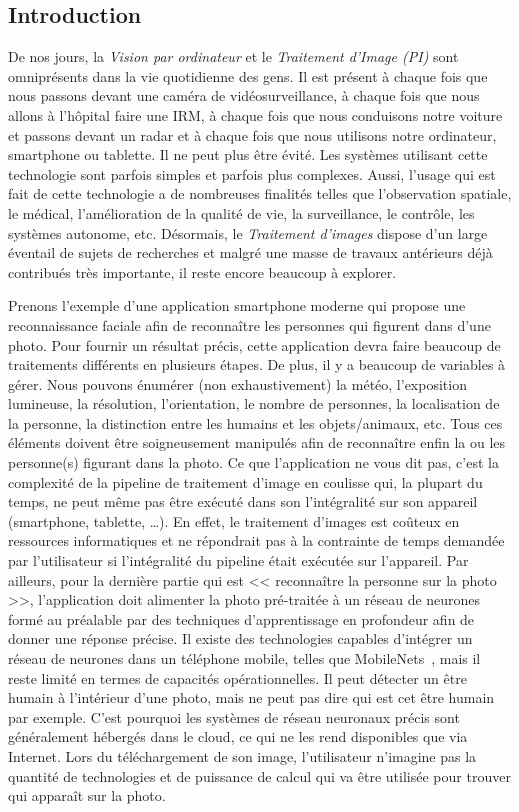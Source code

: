 \subsection*{Introduction}


De nos jours, la \emph{Vision par ordinateur} et le \emph{Traitement d'Image (PI)} sont omniprésents dans la vie
quotidienne des gens. Il est présent à chaque fois que nous passons devant une caméra de vidéosurveillance, à chaque
fois que nous allons à l'hôpital faire une IRM, à chaque fois que nous conduisons notre voiture et passons devant
un radar et à chaque fois que nous utilisons notre ordinateur, smartphone ou tablette. Il ne peut plus être évité. Les
systèmes utilisant cette technologie sont parfois simples et parfois plus complexes. Aussi, l'usage qui est fait de
cette technologie a de nombreuses finalités telles que l'observation spatiale, le médical, l'amélioration de la qualité
de vie, la surveillance, le contrôle, les systèmes autonome, etc. Désormais, le \emph{Traitement d'images} dispose d'un
large éventail de sujets de recherches et malgré une masse de travaux antérieurs déjà contribués très importante, il reste
encore beaucoup à explorer.

Prenons l'exemple d'une application smartphone moderne qui propose une reconnaissance faciale afin de reconnaître les
personnes qui figurent dans d'une photo. Pour fournir un résultat précis, cette application devra faire beaucoup de
traitements différents en plusieurs étapes. De plus, il y a beaucoup de variables à gérer. Nous pouvons énumérer (non
exhaustivement) la météo, l'exposition lumineuse, la résolution, l'orientation, le nombre de personnes, la localisation
de la personne, la distinction entre les humains et les objets/animaux, etc. Tous ces éléments doivent être
soigneusement manipulés afin de reconnaître enfin la ou les personne(s) figurant dans la photo. Ce que l'application ne
vous dit pas, c'est la complexité de la pipeline de traitement d'image en coulisse  qui, la plupart du temps, ne peut
même pas être exécuté dans son l'intégralité sur son appareil (smartphone, tablette, \ldots). En effet, le traitement
d'images est coûteux en ressources informatiques et ne répondrait pas à la contrainte de temps demandée par
l'utilisateur si l'intégralité du pipeline était exécutée sur l'appareil. Par ailleurs, pour la dernière partie qui est
<< reconnaître la personne sur la photo >>, l'application doit alimenter la photo pré-traitée à un réseau de neurones
formé au préalable par des techniques d'apprentissage en profondeur afin de donner une réponse précise. Il existe des
technologies capables d'intégrer un réseau de neurones dans un téléphone mobile, telles que
MobileNets~\parencite{howard.2017.mobilenets}, mais il reste limité en termes de capacités opérationnelles. Il peut
détecter un être humain à l'intérieur d'une photo, mais ne peut pas dire qui est cet être humain par exemple. C'est
pourquoi les systèmes de réseau neuronaux précis sont généralement hébergés dans le cloud, ce qui ne les rend
disponibles que via Internet. Lors du téléchargement de son image, l'utilisateur n'imagine pas la quantité de
technologies et de puissance de calcul qui va être utilisée pour trouver qui apparaît sur la photo.

